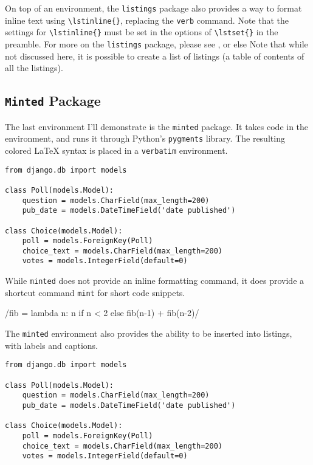 On top of an environment, the \lstinline{listings} package also provides a way to format inline text using \lstinline|\lstinline{}|, replacing the \lstinline{verb} command. Note that the settings for \lstinline|\lstinline{}| must be set in the options of \lstinline|\lstset{}| in the preamble. For more on the \lstinline{listings} package, please see , or else 
Note that while not discussed here, it is possible to create a list of listings (a table of contents of all the listings).

\subsection{\texttt{Minted} Package}

The last environment I'll demonstrate is the \verb|minted| package. It takes code in the environment, and runs it through Python's \verb|pygments| library. The resulting colored \LaTeX{} syntax is placed in a \verb|verbatim| environment.

\begin{verbatim}
from django.db import models

class Poll(models.Model):
    question = models.CharField(max_length=200)
    pub_date = models.DateTimeField('date published')

class Choice(models.Model):
    poll = models.ForeignKey(Poll)
    choice_text = models.CharField(max_length=200)
    votes = models.IntegerField(default=0)
\end{verbatim}

While \verb|minted| does not provide an inline formatting command, it does provide a shortcut command \verb|mint| for short code snippets.

/fib = lambda n: n if n < 2 else fib(n-1) + fib(n-2)/

The \verb|minted| environment also provides the ability to be inserted into listings, with labels and captions.

\begin{listing}[H]
\begin{verbatim}
from django.db import models

class Poll(models.Model):
    question = models.CharField(max_length=200)
    pub_date = models.DateTimeField('date published')

class Choice(models.Model):
    poll = models.ForeignKey(Poll)
    choice_text = models.CharField(max_length=200)
    votes = models.IntegerField(default=0)
\end{verbatim}
\cprotect\caption{\verb|models.py| from Django Tutorial}
\label{code:django:models_basic_minted}
\end{listing}

